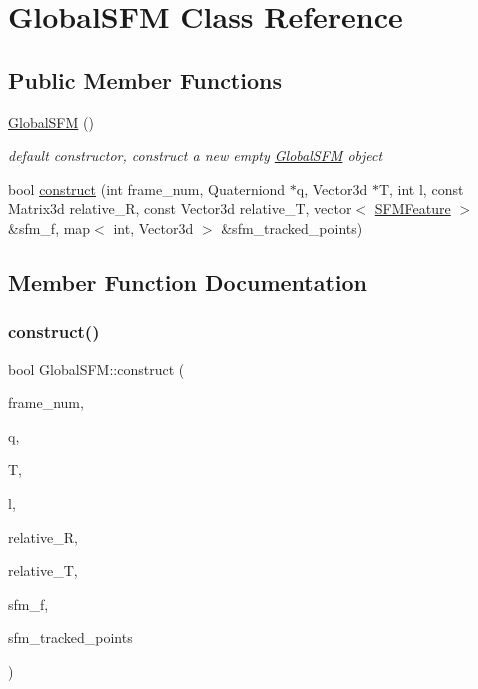 \hypertarget{classGlobalSFM}{}\section{Global\+S\+FM Class Reference}
\label{classGlobalSFM}
\subsection*{Public Member Functions}
\begin{DoxyCompactItemize}
\item 
\mbox{\label{classGlobalSFM_a221ce592c227dad2eb64d92a39b029be}} 
\hyperlink{classGlobalSFM_a221ce592c227dad2eb64d92a39b029be}{Global\+S\+FM} ()
\begin{DoxyCompactList}\small\item\em default constructor, construct a new empty \hyperlink{classGlobalSFM}{Global\+S\+FM} object \end{DoxyCompactList}\item 
bool \hyperlink{classGlobalSFM_a74db5ddeae54cef949e68a4a6bde3844}{construct} (int frame\+\_\+num, Quaterniond $\ast$q, Vector3d $\ast$T, int l, const Matrix3d relative\+\_\+R, const Vector3d relative\+\_\+T, vector$<$ \hyperlink{structSFMFeature}{S\+F\+M\+Feature} $>$ \&sfm\+\_\+f, map$<$ int, Vector3d $>$ \&sfm\+\_\+tracked\+\_\+points)
\end{DoxyCompactItemize}


\subsection{Member Function Documentation}
\mbox{\label{classGlobalSFM_a74db5ddeae54cef949e68a4a6bde3844}} 
\subsubsection{\texorpdfstring{construct()}{construct()}}
{\footnotesize\ttfamily bool Global\+S\+F\+M\+::construct (\begin{DoxyParamCaption}\item[{int}]{frame\+\_\+num,  }\item[{Quaterniond $\ast$}]{q,  }\item[{Vector3d $\ast$}]{T,  }\item[{int}]{l,  }\item[{const Matrix3d}]{relative\+\_\+R,  }\item[{const Vector3d}]{relative\+\_\+T,  }\item[{vector$<$ \hyperlink{structSFMFeature}{S\+F\+M\+Feature} $>$ \&}]{sfm\+\_\+f,  }\item[{map$<$ int, Vector3d $>$ \&}]{sfm\+\_\+tracked\+\_\+points }\end{DoxyParamCaption})}


